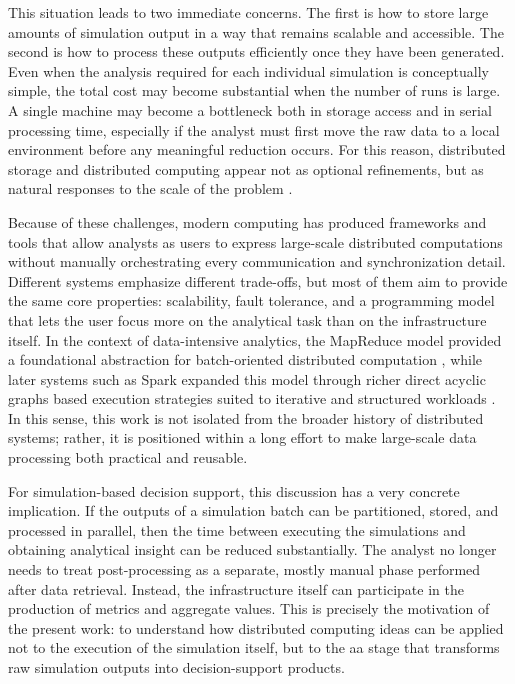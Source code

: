 This situation leads to two immediate concerns. The first is how to store large amounts of simulation output in a way that remains scalable and accessible. The second is how to process these outputs efficiently once they have been generated. Even when the analysis required for each individual simulation is conceptually simple, the total cost may become substantial when the number of runs is large. A single machine may become a bottleneck both in storage access and in serial processing time, especially if the analyst must first move the raw data to a local environment before any meaningful reduction occurs. For this reason, distributed storage and distributed computing appear not as optional refinements, but as natural responses to the scale of the problem \parencite{ghemawat2003gfs,dean2004mapreduce}.

Because of these challenges, modern computing has produced frameworks and tools that allow analysts as users to express large-scale distributed computations without manually orchestrating every communication and synchronization detail. Different systems emphasize different trade-offs, but most of them aim to provide the same core properties: scalability, fault tolerance, and a programming model that lets the user focus more on the analytical task than on the infrastructure itself. In the context of data-intensive analytics, the MapReduce model provided a foundational abstraction for batch-oriented distributed computation \parencite{dean2004mapreduce}, while later systems such as Spark expanded this model through richer direct acyclic graphs based execution strategies suited to iterative and structured workloads \parencite{zaharia2012rdd,armbrust2015sparksql}. In this sense, this work is not isolated from the broader history of distributed systems; rather, it is positioned within a long effort to make large-scale data processing both practical and reusable.

For simulation-based decision support, this discussion has a very concrete implication. If the outputs of a simulation batch can be partitioned, stored, and processed in parallel, then the time between executing the simulations and obtaining analytical insight can be reduced substantially. The analyst no longer needs to treat post-processing as a separate, mostly manual phase performed after data retrieval. Instead, the infrastructure itself can participate in the production of metrics and aggregate values. This is precisely the motivation of the present work: to understand how distributed computing ideas can be applied not to the execution of the simulation itself, but to the \gls{aa} stage that transforms raw simulation outputs into decision-support products.

